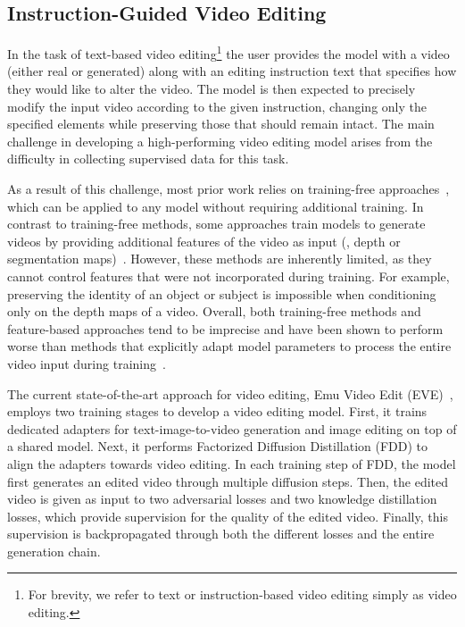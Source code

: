\subsection{Instruction-Guided Video Editing}
\label{subsec:edit_background}
In the task of text-based video editing\footnote{For brevity, we refer to text or instruction-based video editing simply as video editing.} the user provides the model with a video (either real or generated) along with an editing instruction text that specifies how they would like to alter the video.
The model is then expected to precisely modify the input video according to the given instruction, changing only the specified elements while preserving those that should remain intact.
The main challenge in developing a high-performing video editing model arises from the difficulty in collecting supervised data for this task.

As a result of this challenge, most prior work relies on training-free approaches~\citep{meng2021sdedit,Geyer2023TokenFlowCD,vid2vid-zero,text2video-zero,li2023vidtome,Ceylan2023Pix2VideoVE,2312.04524,yang2023rerender}, which can be applied to any \textToV model without requiring additional training.
In contrast to training-free methods, some approaches train models to generate videos by providing additional features of the video as input (\eg, depth or segmentation maps)~\citep{esser2023structure,Liang2023FlowVidTI,Yan2023MotionConditionedIA}.
However, these methods are inherently limited, as they cannot control features that were not incorporated during training.
For example, preserving the identity of an object or subject is impossible when conditioning only on the depth maps of a video.
Overall, both training-free methods and feature-based approaches tend to be imprecise and have been shown to perform worse than methods that explicitly adapt model parameters to process the entire video input during training~\citep{EVE,Qin2023InstructVid2VidCV}.

The current state-of-the-art approach for video editing, Emu Video Edit (EVE)~\citep{EVE}, employs two training stages to develop a video editing model.
First, it trains dedicated adapters for text-image-to-video generation and image editing on top of a shared \textToI model.
Next, it performs Factorized Diffusion Distillation (FDD) to align the adapters towards video editing.
In each training step of FDD, the model first generates an edited video through multiple diffusion steps.
Then, the edited video is given as input to two adversarial losses and two knowledge distillation losses, which provide supervision for the quality of the edited video.
Finally, this supervision is backpropagated through both the different losses and the entire generation chain.

